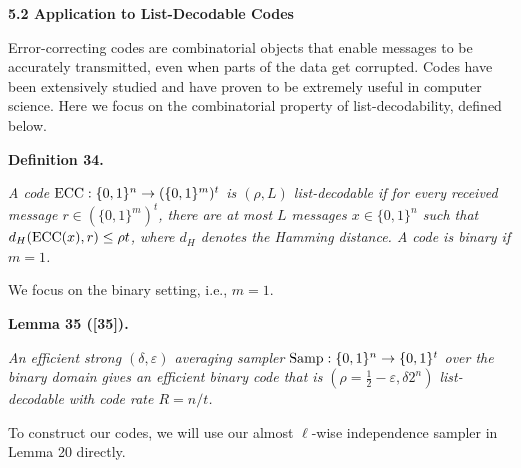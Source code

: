 \documentclass[10pt,a4paper]{article}
\begin{document}
\par\medskip\noindent\textbf{
5.2 Application to List-Decodable Codes}\par




Error-correcting codes are combinatorial objects that enable messages to be accurately transmitted, even when parts of the data get corrupted. Codes have been extensively studied and have proven to be extremely useful in computer science. Here we focus on the combinatorial property of list-decodability, defined below.\par





\par\medskip\noindent\textbf{
\textbf{Definition 34}\textbf{.}
}\par



\emph{A code ${\textup{{ECC}}}:\{0,1\}^{n}\rightarrow({\{0,1\}^{m}})^{t}$ is $(\rho,L)$ list-decodable if for every received message $r\in(\{0,1\}^{m})^{t}$, there are at most $L$ messages $x\in\{0,1\}^{n}$ such that $d_{H}({\textup{{ECC}}}(x),r)\leq\rho t$, where $d_{H}$ denotes the Hamming distance. A code is binary if $m=1$.}\par






We focus on the binary setting, i.e., $m=1$.\par





\par\medskip\noindent\textbf{
\textbf{Lemma 35}\textbf{ }([35])\textbf{.}
}\par



\emph{An efficient strong $(\delta,\varepsilon)$ averaging sampler $\textup{{Samp}}:\{0,1\}^{n}\to\{0,1\}^{t}$ over the binary domain gives an efficient binary code that is $(\rho=\frac{1}{2}-\varepsilon,\delta 2^{n})$ list-decodable with code rate $R=n/t$.}\par






To construct our codes, we will use our almost $\ell$-wise independence sampler in Lemma 20 directly.\par
\end{document}
